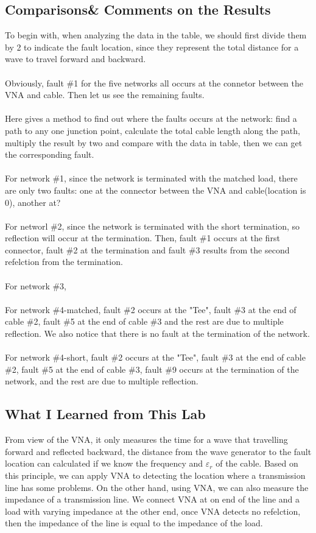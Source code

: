 \documentclass[11pt,oneside,a4paper]{report}
\begin{document}
\subsection*{Comparisons\& Comments on the Results}
To begin with, when analyzing the data in the table, we should first divide them by 2 to indicate the fault location, since they represent the total distance for a wave to travel forward and backward.\\
\\
Obviously, fault \#1 for the five networks all occurs at the connetor between the VNA and cable. Then let us see the remaining faults.\\
\\
Here gives a method to find out where the faults occurs at the network: find a path to any one junction point, calculate the total cable length along the path, multiply the result by two and compare with the data in table, then we can get the corresponding fault.\\
\\
For network \#1, since the network is terminated with the matched load, there are only two faults: one at the connector between the VNA and cable(location is 0), another at?\\
\\
For networl \#2, since the network is terminated with the short termination, so reflection will occur at the termination. Then, fault \#1 occurs at the first connector, fault \#2 at the termination and fault \#3 results from the second refelction from the termination.\\
\\
For network \#3, \\
\\
For network \#4-matched, fault \#2 occurs at the "Tee", fault \#3 at the end of cable \#2, fault \#5 at the end of cable \#3 and the rest are due to multiple reflection. We also notice that there is no fault at the termination of the network.\\
\\
For network \#4-short, fault \#2 occurs at the "Tee", fault \#3 at the end of cable \#2, fault \#5 at the end of cable \#3, fault \#9 occurs at the termination of the network, and the rest are due to multiple reflection.\\

\subsection*{What I Learned from This Lab}
From view of the VNA, it only measures the time for a wave that travelling forward and reflected backward, the distance from the wave generator to the fault location can calculated if we know the frequency and \(\varepsilon_r\) of the cable. Based on this principle, we can apply VNA to detecting the location where a transmission line has some problems. On the other hand, using VNA, we can also measure the impedance of a transmission line. We connect VNA at on end of the line and a load with varying impedance at the other end, once VNA detects no refelction, then the impedance of the line is equal to the impedance of the load.\\
\end{document}
